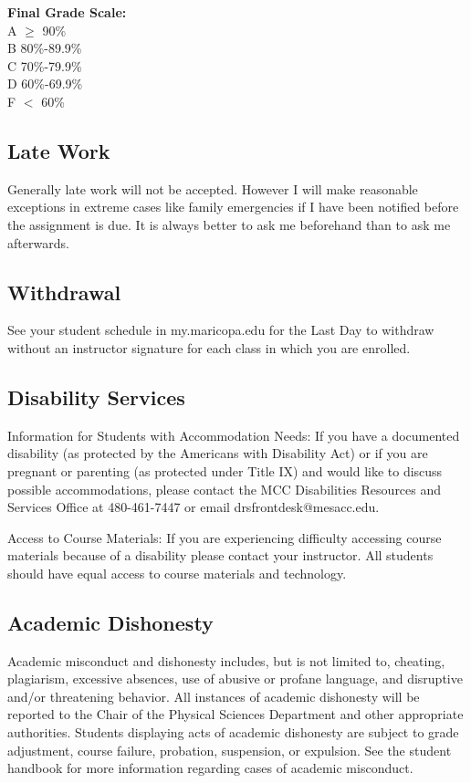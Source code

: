 \documentclass[12pt]{article}
\newcommand{\tabg}{4.3cm} %
\begin{document}
\textbf{Final Grade Scale:} \\
A \tabto{\tabg} $\ge$ 90\% \\
B \tabto{\tabg} 80\%-89.9\% \\
C \tabto{\tabg} 70\%-79.9\% \\
D \tabto{\tabg} 60\%-69.9\% \\
F \tabto{\tabg} $<$ 60\%

\subsection*{Late Work}
Generally late work will not be accepted. However I will make reasonable exceptions in extreme cases like family emergencies if I have been notified before the assignment is due. It is always better to ask me beforehand than to ask me afterwards.

\subsection*{Withdrawal}
See your student schedule in my.maricopa.edu for the Last Day to withdraw without an instructor signature for each class in which you are enrolled.

\subsection*{Disability Services}
Information for Students with Accommodation Needs:  If you have a documented disability (as protected by the Americans with Disability Act) or if you are pregnant or parenting (as protected under Title IX) and would like to discuss possible accommodations, please contact the MCC Disabilities Resources and Services Office at 480-461-7447 or email drsfrontdesk@mesacc.edu.

Access to Course Materials: If you are experiencing difficulty accessing course materials because of a disability please contact your instructor.  All students should have equal access to course materials and technology.

\subsection*{Academic Dishonesty}
Academic misconduct and dishonesty includes, but is not limited to, cheating, plagiarism, excessive absences, use of abusive or profane language, and disruptive and/or threatening behavior.  All instances of academic dishonesty will be reported to the Chair of the Physical Sciences Department and other appropriate authorities.  Students displaying acts of academic dishonesty are subject to grade adjustment, course failure, probation, suspension, or expulsion.  See the student handbook for more information regarding cases of academic misconduct.
\end{document}
